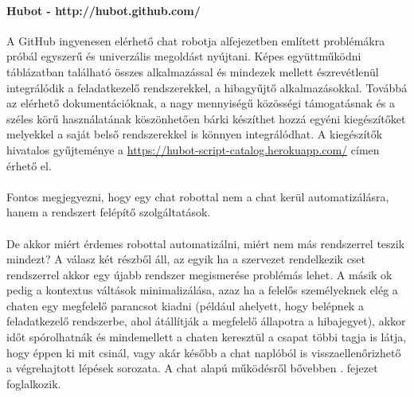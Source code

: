 \paragraph{Hubot - http://hubot.github.com/} A GitHub ingyenesen elérhető chat robotja  alfejezetben említett problémákra próbál egyszerű és univerzális megoldást nyújtani. Képes együttműködni  táblázatban található összes alkalmazással és mindezek mellett észrevétlenül integrálódik a feladatkezelő rendszerekkel, a hibagyűjtő alkalmazásokkal. Továbbá az elérhető dokumentációknak, a nagy mennyiségű közösségi támogatásnak és a széles körű használatának köszönhetően bárki készíthet hozzá egyéni kiegészítőket melyekkel a saját belső rendszerekkel is könnyen integrálódhat. A kiegészítők hivatalos gyűjteménye a \url{https://hubot-script-catalog.herokuapp.com/} címen érhető el.\\
\hfill\\
Fontos megjegyezni, hogy egy chat robottal nem a chat kerül automatizálásra, hanem a rendszert felépítő szolgáltatások.\\
\hfill\\
De akkor miért érdemes robottal automatizálni, miért nem más rendszerrel teszik mindezt? A válasz két részből áll, az egyik ha a szervezet rendelkezik cset rendszerrel akkor egy újabb rendszer megismerése problémás lehet. A másik ok pedig a kontextus váltások minimalizálása, azaz ha a felelős személyeknek elég a chaten egy megfelelő parancsot kiadni (például ahelyett, hogy belépnek a feladatkezelő rendszerbe, ahol átállítják a megfelelő állapotra a hibajegyet), akkor időt spórolhatnák és mindemellett a chaten keresztül a csapat többi tagja is látja, hogy éppen ki mit csinál, vagy akár később a chat naplóból is visszaellenőrizhető a végrehajtott lépések sorozata. A chat alapú működésről bővebben . fejezet foglalkozik.
